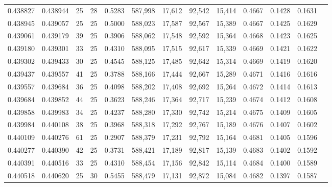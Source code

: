 \begin{tabular}{rrrrrrrrrrrrr}
0.438827 & 0.438944 &    25 &  28 &                                     0.5283 & 587,998 &  17,612 &  92,542 &  15,414 & 0.4667 & 0.1428 & 0.1631 \\
0.438945 & 0.439057 &    25 &  25 &                                     0.5000 & 588,023 &  17,587 &  92,567 &  15,389 & 0.4667 & 0.1425 & 0.1629 \\
0.439061 & 0.439179 &    39 &  25 &                                     0.3906 & 588,062 &  17,548 &  92,592 &  15,364 & 0.4668 & 0.1423 & 0.1625 \\
0.439180 & 0.439301 &    33 &  25 &                                     0.4310 & 588,095 &  17,515 &  92,617 &  15,339 & 0.4669 & 0.1421 & 0.1622 \\
0.439302 & 0.439433 &    30 &  25 &                                     0.4545 & 588,125 &  17,485 &  92,642 &  15,314 & 0.4669 & 0.1419 & 0.1620 \\
0.439437 & 0.439557 &    41 &  25 &                                     0.3788 & 588,166 &  17,444 &  92,667 &  15,289 & 0.4671 & 0.1416 & 0.1616 \\
0.439557 & 0.439684 &    36 &  25 &                                     0.4098 & 588,202 &  17,408 &  92,692 &  15,264 & 0.4672 & 0.1414 & 0.1613 \\
0.439684 & 0.439852 &    44 &  25 &                                     0.3623 & 588,246 &  17,364 &  92,717 &  15,239 & 0.4674 & 0.1412 & 0.1608 \\
0.439858 & 0.439983 &    34 &  25 &                                     0.4237 & 588,280 &  17,330 &  92,742 &  15,214 & 0.4675 & 0.1409 & 0.1605 \\
0.439984 & 0.440108 &    38 &  25 &                                     0.3968 & 588,318 &  17,292 &  92,767 &  15,189 & 0.4676 & 0.1407 & 0.1602 \\
0.440109 & 0.440276 &    61 &  25 &                                     0.2907 & 588,379 &  17,231 &  92,792 &  15,164 & 0.4681 & 0.1405 & 0.1596 \\
0.440277 & 0.440390 &    42 &  25 &                                     0.3731 & 588,421 &  17,189 &  92,817 &  15,139 & 0.4683 & 0.1402 & 0.1592 \\
0.440391 & 0.440516 &    33 &  25 &                                     0.4310 & 588,454 &  17,156 &  92,842 &  15,114 & 0.4684 & 0.1400 & 0.1589 \\
0.440518 & 0.440620 &    25 &  30 &                                     0.5455 & 588,479 &  17,131 &  92,872 &  15,084 & 0.4682 & 0.1397 & 0.1587 \\

\end{tabular}
